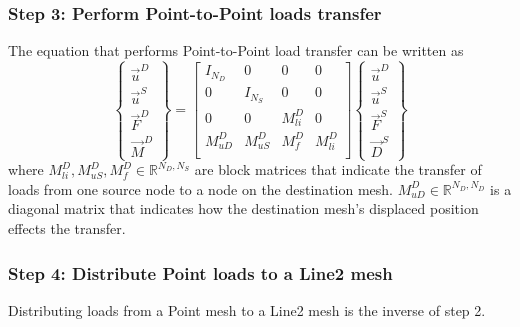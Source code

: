 \documentclass[10pt,letterpaper,oneside,notitlepage]{article}
\begin{document}
\subsubsection{Step 3: Perform Point-to-Point loads transfer}
The equation that performs Point-to-Point load transfer can be written as
\begin{equation}
\label{P2P}
	\left\{	\begin{matrix} \vec{u}^D \\ \vec{u}^{S} \\ \vec{F}^{D} \\ \vec{M}^{D} \end{matrix} \right\} 
=
	\begin{bmatrix}
	I_{\mathit{N_D}} & 0   								 & 0   				& 0          \\
	0 							 & I_{\mathit{N_{S}}}  & 0   				& 0          \\
	0 							 & 0  								 & M_{li}^{D} & 0          \\
	M_{uD}^{D} 		   & M_{uS}^{D}    		   & M_{f}^{D}  & M_{li}^{D} \\
	\end{bmatrix}
	\left\{	\begin{matrix} \vec{u}^D \\ \vec{u}^{S}  \\ \vec{F}^{S}  \\ \vec{D}^{S} \end{matrix} \right\} 
\end{equation}
where $M_{li}^{D}, M_{uS}^{D}, M_{f}^{D} \in \mathbb{R}^{ \mathit{N_{D}},\mathit{N_{S}}}$ are block matrices that indicate the transfer of loads from one source
node to a node on the destination mesh. $M_{uD}^{D} \in \mathbb{R}^{ \mathit{N_{D}},\mathit{N_{D}}}$ is a diagonal matrix that indicates how the destination mesh's displaced position effects the transfer.


\subsubsection{Step 4: Distribute Point loads to a Line2 mesh}
Distributing loads from a Point mesh to a Line2 mesh is the inverse of step 2.
\end{document}
